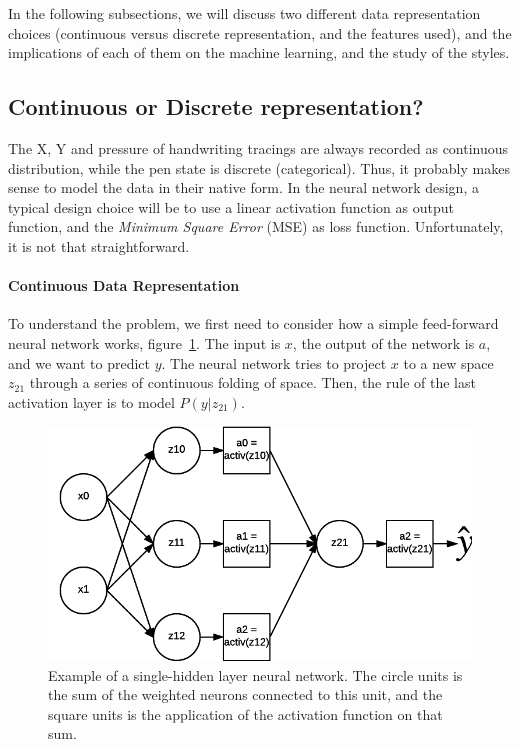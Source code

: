   \par In the following subsections, we will discuss two different data representation choices (continuous versus discrete representation, and the features used), and the implications of each of them on the machine learning, and the study of the styles.

  \subsection{Continuous or Discrete representation?}

    \par The X, Y and pressure of handwriting tracings are always recorded as continuous distribution, while the pen state is discrete (categorical). Thus, it probably makes sense to model the data in their native form. In the neural network design, a typical design choice will be to use a linear activation function as output function, and the \textit{Minimum Square Error} (MSE) as loss function. Unfortunately, it is not that straightforward.

    \paragraph{Continuous Data Representation}
      \par To understand the problem, we first need to consider how a simple feed-forward neural network works, figure~\ref{fig:mlp_simple}. The input is $x$, the output of the network is $a$, and we want to predict $y$. The neural network tries to project $x$ to a new space $z_{21}$ through a series of continuous folding of space. Then, the rule of the last activation layer is to model $P(y|z_{21})$.

      \begin{figure}[!htbp]
          \centering
          \includegraphics[scale=0.8]{images/sota/Multi-layer-perceptron2.png}
          \caption{Example of a single-hidden layer neural network. The circle units is the sum of the weighted neurons connected to this unit, and the square units is the application of the activation function on that sum.}%
          \label{fig:mlp_simple}
      \end{figure}

